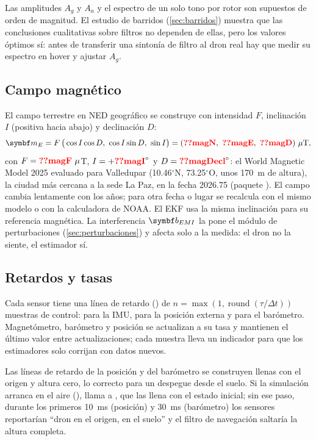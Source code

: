 \begin{supuesto}
Las amplitudes $A_g$ y $A_a$ y el espectro de un solo tono por rotor son
supuestos de orden de magnitud. El estudio de barridos (\cref{sec:barridos})
muestra que las conclusiones cualitativas sobre filtros no dependen de ellas,
pero los valores óptimos sí: antes de transferir una sintonía de filtro al
dron real hay que medir su espectro en hover y ajustar $A_g$.
\end{supuesto}

\subsection{Campo magnético}

El campo terrestre en NED geográfico se construye con intensidad $F$,
inclinación $I$ (positiva hacia abajo) y declinación $D$:
\begin{equation}
\vect m_E = F\,\big(\cos I\cos D,\ \cos I\sin D,\ \sin I\big)
= (\val{magN},\ \val{magE},\ \val{magD})~\mu\text{T},
\label{eq:magE}
\end{equation}
con $F=\val{magF}~\mu$T, $I=+\val{magI}^\circ$ y $D=\val{magDecl}^\circ$: el
World Magnetic Model 2025 evaluado para Valledupar (10.46$^\circ$N,
73.25$^\circ$O, unos 170~m de altura), la ciudad más cercana a la sede La
Paz, en la fecha 2026.75 (paquete ). El campo cambia
lentamente con los años; para otra fecha o lugar se recalcula con el mismo
modelo o con la calculadora de NOAA. El EKF usa la misma inclinación para su
referencia magnética. La interferencia $\vect b_{EMI}$ la pone el módulo de
perturbaciones (\cref{sec:perturbaciones}) y afecta solo a la medida: el dron
no la siente, el estimador sí.

\subsection{Retardos y tasas}

Cada sensor tiene una línea de retardo () de
$n=\max(1,\operatorname{round}(\tau/\Delta t))$ muestras de control: 
para la IMU,  para la posición externa y  para el
barómetro. Magnetómetro, barómetro y posición se actualizan a su tasa y
mantienen el último valor entre actualizaciones; cada muestra lleva un
indicador  para que los estimadores solo corrijan con datos
nuevos.

\begin{nota}
Las líneas de retardo de la posición y del barómetro se construyen llenas
con el origen y altura cero, lo correcto para un despegue desde el suelo. Si
la simulación arranca en el aire (),
 llama a , que las
llena con el estado inicial; sin ese paso, durante los primeros 10~ms
(posición) y 30~ms (barómetro) los sensores reportarían ``dron en el origen,
en el suelo'' y el filtro de navegación saltaría la altura completa.
\end{nota}
